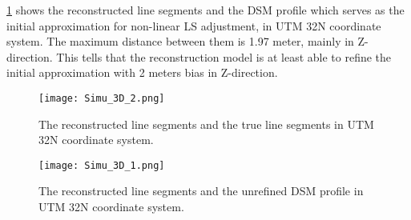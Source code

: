 \cref{fig:Simu3D_1} shows the reconstructed line segments and the DSM profile which serves as the initial approximation for non-linear LS adjustment, in UTM 32N coordinate system. The maximum distance between them is 1.97 meter, mainly in Z-direction. This tells that {the reconstruction model is at least able to refine the initial approximation with 2 meters bias in Z-direction}.

\begin{figure}
  \centering
  \texttt{[image: Simu\_3D\_2.png]} %
  \caption{\small The reconstructed line segments and the true line segments in UTM 32N coordinate system.}
  \label{fig:Simu3D_2}
  \vspace{1cm}
  \centering
  \texttt{[image: Simu\_3D\_1.png]}
  \caption{\small The reconstructed line segments and the unrefined DSM profile in UTM 32N coordinate system.}
  \label{fig:Simu3D_1}
\end{figure}

\clearpage







